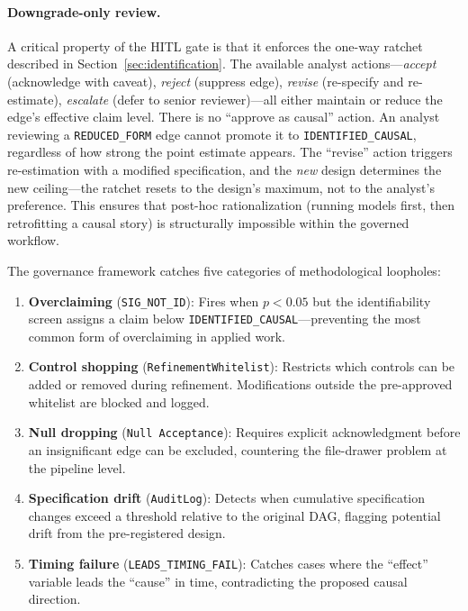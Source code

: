 \documentclass{article}
\begin{document}
\paragraph{Downgrade-only review.} A critical property of the HITL gate is that it enforces the one-way ratchet described in Section~\ref{sec:identification}. The available analyst actions---\emph{accept} (acknowledge with caveat), \emph{reject} (suppress edge), \emph{revise} (re-specify and re-estimate), \emph{escalate} (defer to senior reviewer)---all either maintain or reduce the edge's effective claim level. There is no ``approve as causal'' action. An analyst reviewing a \texttt{REDUCED\_FORM} edge cannot promote it to \texttt{IDENTIFIED\_CAUSAL}, regardless of how strong the point estimate appears. The ``revise'' action triggers re-estimation with a modified specification, and the \emph{new} design determines the new ceiling---the ratchet resets to the design's maximum, not to the analyst's preference. This ensures that post-hoc rationalization (running models first, then retrofitting a causal story) is structurally impossible within the governed workflow.

The governance framework catches five categories of methodological loopholes:

\begin{enumerate}[leftmargin=*, itemsep=1pt]
    \item \textbf{Overclaiming} (\texttt{SIG\_NOT\_ID}): Fires when $p < 0.05$ but the identifiability screen assigns a claim below \texttt{IDENTIFIED\_CAUSAL}---preventing the most common form of overclaiming in applied work.
    \item \textbf{Control shopping} (\texttt{RefinementWhitelist}): Restricts which controls can be added or removed during refinement. Modifications outside the pre-approved whitelist are blocked and logged.
    \item \textbf{Null dropping} (\texttt{Null Acceptance}): Requires explicit acknowledgment before an insignificant edge can be excluded, countering the file-drawer problem at the pipeline level.
    \item \textbf{Specification drift} (\texttt{AuditLog}): Detects when cumulative specification changes exceed a threshold relative to the original DAG, flagging potential drift from the pre-registered design.
    \item \textbf{Timing failure} (\texttt{LEADS\_TIMING\_FAIL}): Catches cases where the ``effect'' variable leads the ``cause'' in time, contradicting the proposed causal direction.
\end{enumerate}
\end{document}
